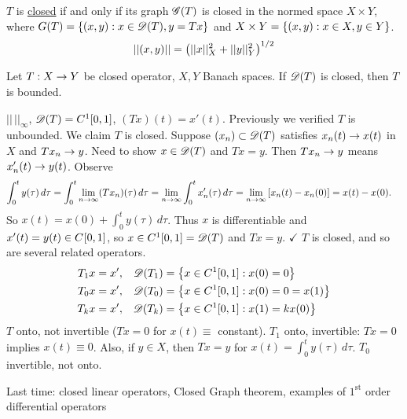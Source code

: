 \documentclass[]{article}
\begin{document}
\begin{theorem}
	$T$ is \ul{closed} if and only if its graph $\mathscr{G}(T)$ is closed in the normed space $X\times Y$, where $G(T) = \left\{ (x,y) : x\in\mathscr{D}(T),y=Tx \right\}$ and $X\times Y = \left\{ (x,y) : x\in X,y\in Y \right\}$.
	$$ ||(x,y)|| = \left(||x||_X^2+||y||_Y^2\right)^{1/2} $$
\end{theorem}
\newpage
\begin{theorem}
	Let $T:X\rightarrow Y$ be closed operator, $X,Y$ Banach spaces.
	If $\mathscr{D}(T)$ is closed, then $T$ is bounded.
\end{theorem}
\begin{example}
	[$X=\Cb{}01$]
	$||\,||_\infty$, $\mathscr{D}(T)=C^{1}{[}0,1{]}$, $(Tx)(t)=x'(t)$.
	Previously we verified $T$ is unbounded. We claim $T$ is closed.
	Suppose $(x_n)\subset\mathscr{D}(T)$ satisfies $x_n(t)\rightarrow x(t)$ in $X$ and $Tx_n\rightarrow y$.
	Need to show $x\in\mathscr{D}(T)$ and $Tx=y$.
	Then $Tx_n\rightarrow y$ means $x_n'(t)\rightarrow y(t)$. Observe
	\begin{align*}
		\int_0^t y(\tau)\,d\tau 
		&= \int_0^t \lim_{n\rightarrow\infty}(Tx_n)(\tau)\,d\tau
		= \lim_{n\rightarrow\infty} \int_0^t x_n'(\tau)\,d\tau
		= \lim_{n\rightarrow\infty}\left[x_n(t)-x_n(0)\right] = x(t)-x(0).
	\end{align*}
	So $x(t)=x(0)+\int_0^t y(\tau)\,d\tau$.
	Thus $x$ is differentiable and $x'(t)=y(t)\in C^{}{[}0,1{]}$, so $x\in C^{1}{[}0,1{]}=\mathscr{D}(T)$ and $Tx=y$. $\checkmark$
	$T$ is closed, and so are several related operators.
	\begin{align*}
		T_1x &= x', & \mathscr{D}(T_1) &= \left\{ x\in C^{1}{[}0,1{]} : x(0)=0 \right\} \\
		T_0x &= x', & \mathscr{D}(T_0) &= \left\{ x\in C^{1}{[}0,1{]} : x(0)=0=x(1) \right\} \\
		T_kx &= x', & \mathscr{D}(T_k) &= \left\{ x\in C^{1}{[}0,1{]} : x(1)=k x(0) \right\}
	\end{align*}
	$T$ onto, not invertible ($Tx=0$ for $x(t)\equiv$ constant).
	$T_1$ onto, invertible: $Tx=0$ implies $x(t)\equiv0$.
	Also, if $y\in X$, then $Tx=y$ for $x(t)=\int_0^ty(\tau)\,d\tau$.
	$T_0$ invertible, not onto.
\end{example}

Last time: closed linear operators, Closed Graph theorem, examples of $1^\text{st}$ order differential operators
\end{document}
